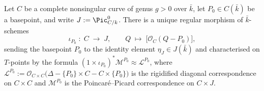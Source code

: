 \begin{lemma}
  Let \(C\) be a complete nonsingular curve of genus \(g > 0\) over \(\bar k\), let
  \(P_0 \in C(\bar k)\) be a basepoint, and write \(J := \Pic^0_{C/k}\). There is a
  unique regular morphism of \(\bar k\)-schemes
  \[
    \iota_{P_0} \;\colon\; C \;\longrightarrow\; J, \qquad
    Q \;\longmapsto\; \bigl[\mathcal O_C(Q - P_0)\bigr],
  \]
  sending the basepoint \(P_0\) to the identity element \(\eta_J \in J(\bar k)\)
  and characterised on \(T\)-points by the formula
  \((1 \times \iota_{P_0})^*\mathcal M^{P_0} \approx \mathcal L^{P_0}\), where
  \(\mathcal L^{P_0} := \mathcal O_{C \times C}\bigl(\Delta - \{P_0\} \times C -
  C \times \{P_0\}\bigr)\) is the rigidified diagonal correspondence on
  \(C \times C\) and \(\mathcal M^{P_0}\) is the Poincar\'e--Picard correspondence
  on \(C \times J\).
\end{lemma}

